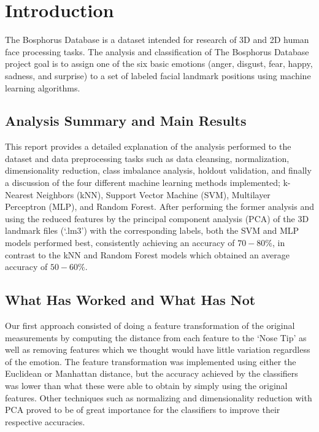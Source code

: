 \section{Introduction}

The Bosphorus Database is a dataset intended for research of 3D and 2D human face processing tasks. The analysis and classification of The Bosphorus Database project goal is to assign one of the six basic emotions (anger, disgust, fear, happy, sadness, and surprise) to a set of labeled facial landmark positions using machine learning algorithms.

\subsection{Analysis Summary and Main Results}
This report provides a detailed explanation of the analysis performed to the dataset and data preprocessing tasks such as data cleansing, normalization, dimensionality reduction, class imbalance analysis, holdout validation, and finally a discussion of the four different machine learning methods implemented; k-Nearest Neighbors (kNN), Support Vector Machine (SVM), Multilayer Perceptron (MLP), and Random Forest. After performing the former analysis and using the reduced features by the principal component analysis (PCA) of the 3D landmark files (`.lm3') with the corresponding labels, both the SVM and MLP models performed best, consistently achieving an accuracy of $70-80\%$, in contrast to the kNN and Random Forest models which obtained an average accuracy of $50-60\%$.

\subsection{What Has Worked and What Has Not}
Our first approach consisted of doing a feature transformation of the original measurements by computing the distance from each feature to the `Nose Tip' as well as removing features which we thought would have little variation regardless of the emotion. The feature transformation was implemented using either the Euclidean or  Manhattan distance, but the accuracy achieved by the classifiers was lower than what these were able to obtain by simply using the original features. Other techniques such as normalizing and dimensionality reduction with PCA proved to be of great importance for the classifiers to improve their respective accuracies.

